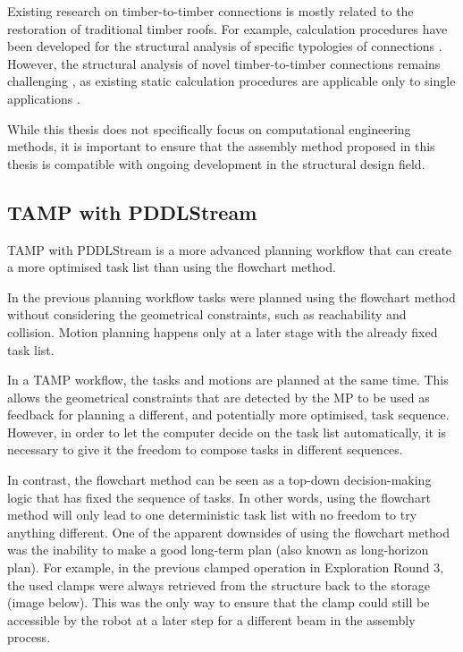 Existing research on timber-to-timber connections is mostly related to the restoration of traditional timber roofs. For example, calculation procedures have been developed for the structural analysis of specific typologies of connections \parencite{holzerstefanm.StaticAssessmentHistorical2015}. However, the structural analysis of novel timber-to-timber connections remains challenging \parencite{tanadiniAnalysisDesignTimbertotimber2021}, as existing static calculation procedures are applicable only to single applications \parencite{fangJoineryConnectionsTimber2018, nguyenDevelopmentSpringModel2018, rezaeiradMacroscopicModelSpatial2020}. 

While this thesis does not specifically focus on computational engineering methods, it is important to ensure that the assembly method proposed in this thesis is compatible with ongoing development in the structural design field.

\subsection{TAMP with PDDLStream}
\label{subsection:exploration_5_tamp_with_pddlstream}

TAMP with PDDLStream \parencite{garrettPDDLStreamIntegratingSymbolic2020}is a more advanced planning workflow that can create a more optimised task list than using the flowchart method.

In the previous planning workflow  tasks were planned using the flowchart method  without considering the geometrical constraints, such as reachability and collision. Motion planning happens only at a later stage with the already fixed task list. 

In a TAMP workflow, the tasks and motions are planned at the same time. This allows the geometrical constraints that are detected by the MP to be used as feedback for planning a different, and potentially more optimised, task sequence. However, in order to let the computer decide on the task list automatically, it is necessary to give it the freedom to compose tasks in different sequences. 

In contrast, the flowchart method can be seen as a top-down decision-making logic that has fixed the sequence of tasks. In other words, using the flowchart method will only lead to one deterministic task list with no freedom to try anything different. One of the apparent downsides of using the flowchart method was the inability to make a good long-term plan (also known as long-horizon plan). For example, in the previous clamped operation in Exploration Round 3, the used clamps were always retrieved from the structure back to the storage (image below). This was the only way to ensure that the clamp could still be accessible by the robot at a later step for a different beam in the assembly process. 

